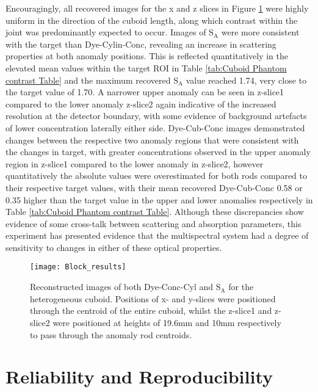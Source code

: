 \documentclass[twoside]{bhamthesis}
\theoremstyle{definition}
\begin{document}
Encouragingly, all recovered images for the x and z slices in Figure \ref{fig:Block_results} were highly uniform in the direction of the cuboid length, along which contrast within the joint was predominantly expected to occur. Images of $\mathrm{S_A}$ were more consistent with the target than Dye-Cylin-Conc, revealing an increase in scattering properties at both anomaly positions. This is reflected quantitatively in the elevated mean values within the target ROI in Table \ref{tab:Cuboid Phantom contrast Table} and the maximum recovered $\mathrm{S_A}$ value reached 1.74, very close to the target value of 1.70. A narrower upper anomaly can be seen in z-slice1 compared to the lower anomaly z-slice2 again indicative of the increased resolution at the detector boundary, with some evidence of background artefacts of lower concentration laterally either side. Dye-Cub-Conc images demonstrated changes between the respective two anomaly regions that were consistent with the changes in target, with greater concentrations observed in the upper anomaly region in z-slice1 compared to the lower anomaly in z-slice2, however quantitatively  the absolute values were overestimated for both rods compared to their respective target values, with their mean recovered Dye-Cub-Conc 0.58 or 0.35 higher than the target value in the upper and lower anomalies respectively in Table \ref{tab:Cuboid Phantom contrast Table}. Although these discrepancies show evidence of some cross-talk between scattering and absorption parameters, this experiment has presented evidence that the multispectral system had a degree of sensitivity to changes in either of these optical properties.

\begin{figure}[!ht]
\texttt{[image: Block\_results]}
\centering
\caption{Reconstructed images of both Dye-Conc-Cyl and $\mathrm{S_A}$ for the heterogeneous cuboid. Positions of x- and y-slices were positioned through the centroid of the entire cuboid, whilst the z-slice1 and z-slice2 were positioned at heights of 19.6mm and 10mm respectively to pass through the anomaly rod centroids.}
\label{fig:Block_results}
\end{figure}


\section{Reliability and Reproducibility}
\end{document}
